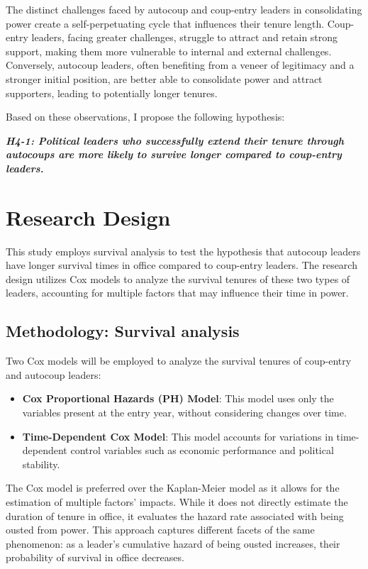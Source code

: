 \documentclass[
  12pt,
]{report}
\begin{document}
The distinct challenges faced by autocoup and coup-entry leaders in
consolidating power create a self-perpetuating cycle that influences
their tenure length. Coup-entry leaders, facing greater challenges,
struggle to attract and retain strong support, making them more
vulnerable to internal and external challenges. Conversely, autocoup
leaders, often benefiting from a veneer of legitimacy and a stronger
initial position, are better able to consolidate power and attract
supporters, leading to potentially longer tenures.

Based on these observations, I propose the following hypothesis:

\textbf{\emph{H4-1: Political leaders who successfully extend their
tenure through autocoups are more likely to survive longer compared to
coup-entry leaders.}}

\section{Research Design}\label{research-design-1}

This study employs survival analysis to test the hypothesis that
autocoup leaders have longer survival times in office compared to
coup-entry leaders. The research design utilizes Cox models to analyze
the survival tenures of these two types of leaders, accounting for
multiple factors that may influence their time in power.

\subsection{Methodology: Survival
analysis}\label{methodology-survival-analysis}

Two Cox models will be employed to analyze the survival tenures of
coup-entry and autocoup leaders:

\begin{itemize}
\item
  \textbf{Cox Proportional Hazards (PH) Model}: This model uses only the
  variables present at the entry year, without considering changes over
  time.
\item
  \textbf{Time-Dependent Cox Model}: This model accounts for variations
  in time-dependent control variables such as economic performance and
  political stability.
\end{itemize}

The Cox model is preferred over the Kaplan-Meier model as it allows for
the estimation of multiple factors' impacts. While it does not directly
estimate the duration of tenure in office, it evaluates the hazard rate
associated with being ousted from power. This approach captures
different facets of the same phenomenon: as a leader's cumulative hazard
of being ousted increases, their probability of survival in office
decreases.
\end{document}
